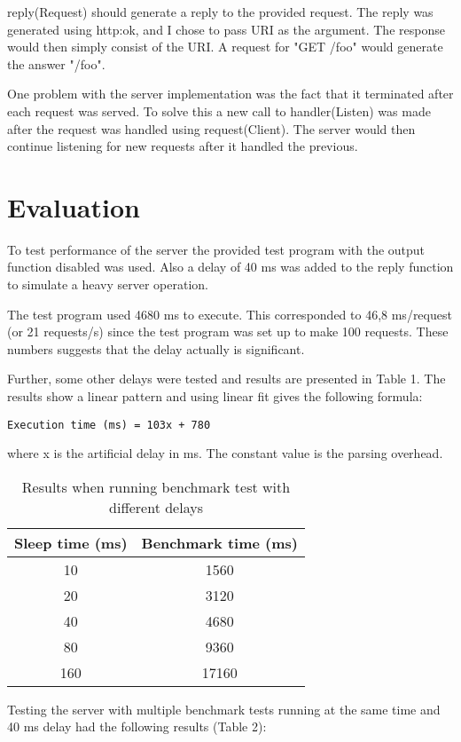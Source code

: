 \documentclass[a4paper, 11pt]{article}
\begin{document}
reply(Request) should generate a reply to the provided request. The reply was generated using http:ok, and I chose to pass URI as the argument. The response would then simply consist of the URI. A request for "GET /foo" would generate the answer "/foo".

One problem with the server implementation was the fact that it terminated after each request was served. To solve this a new call to handler(Listen) was made after the request was handled using request(Client). The server would then continue listening for new requests after it handled the previous.

\section{Evaluation}

To test performance of the server the provided test program with the output function disabled was used. Also a delay of 40 ms was added to the reply function to simulate a heavy server operation. 

The test program used 4680 ms to execute. This corresponded to 46,8 ms/request (or 21 requests/s) since the test program was set up to make 100 requests. These numbers suggests that the delay actually is significant.

Further, some other delays were tested and results are presented in Table 1. The results show a linear pattern and using linear fit gives the following formula:
\begin{verbatim}
Execution time (ms) = 103x + 780
\end{verbatim}
where x is the artificial delay in ms. The constant value is the parsing overhead.

\begin{table}[h]
\centering
\begin{tabular}{cc}
Sleep time (ms) & Benchmark time (ms)\\\hline
10 & 1560\\\hline
20 & 3120\\\hline
40 & 4680\\\hline
80 & 9360\\\hline
160 & 17160\\\hline
\end{tabular}
\caption{Results when running benchmark test with different delays}
\label{tab:results}
\end{table}

Testing the server with multiple benchmark tests running at the same time and 40 ms delay had the following results (Table 2):
\end{document}
